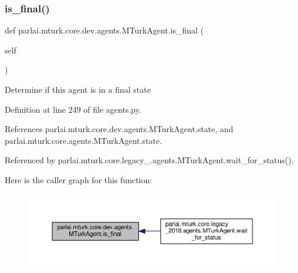 \subsubsection{\texorpdfstring{is\+\_\+final()}{is\_final()}}
{\footnotesize\ttfamily def parlai.\+mturk.\+core.\+dev.\+agents.\+M\+Turk\+Agent.\+is\+\_\+final (\begin{DoxyParamCaption}\item[{}]{self }\end{DoxyParamCaption})}

\begin{DoxyVerb}Determine if this agent is in a final state\end{DoxyVerb}
 

Definition at line 249 of file agents.\+py.



References parlai.\+mturk.\+core.\+dev.\+agents.\+M\+Turk\+Agent.\+state, and parlai.\+mturk.\+core.\+agents.\+M\+Turk\+Agent.\+state.



Referenced by parlai.\+mturk.\+core.\+legacy\+\_.\+agents.\+M\+Turk\+Agent.\+wait\+\_\+for\+\_\+status().

Here is the caller graph for this function\+:
\nopagebreak
\begin{figure}[H]
\begin{center}
\leavevmode
\includegraphics[width=350pt]{classparlai_1_1mturk_1_1core_1_1dev_1_1agents_1_1MTurkAgent_a07577b6f15ab8b64d2bd2aba87a5e011_icgraph}
\end{center}
\end{figure}
\mbox{\label{classparlai_1_1mturk_1_1core_1_1dev_1_1agents_1_1MTurkAgent_a041a1bf11cb466ca9e270c4e423f2a9c}} 
